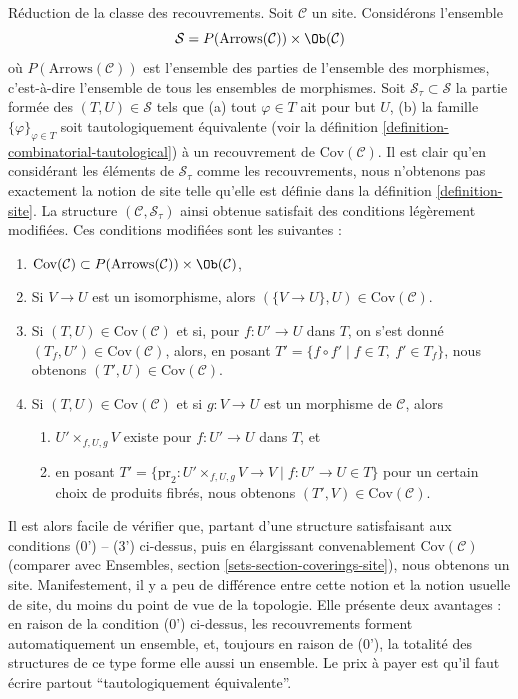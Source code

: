 \begin{remark}
\label{remark-shrink-coverings}
Réduction de la classe des recouvrements. Soit $\mathcal{C}$ un site.
Considérons l'ensemble
$$
\mathcal{S} = P(\text{Arrows}(\mathcal{C})) \times \Ob(\mathcal{C})
$$
où $P(\text{Arrows}(\mathcal{C}))$ est l'ensemble des parties de l'ensemble des morphismes,
c'est-à-dire l'ensemble de tous les ensembles de morphismes.
Soit $\mathcal{S}_\tau \subset \mathcal{S}$
la partie formée des $(T, U) \in \mathcal{S}$ tels que
(a) tout $\varphi \in T$ ait pour but $U$,
(b) la famille $\{\varphi\}_{\varphi \in T}$ soit tautologiquement
équivalente (voir la définition \ref{definition-combinatorial-tautological})
à un recouvrement de $\text{Cov}(\mathcal{C})$.
Il est clair qu'en considérant les éléments de $\mathcal{S}_\tau$ comme
les recouvrements, nous n'obtenons pas exactement la notion de site
telle qu'elle est définie dans la définition \ref{definition-site}.
La structure $(\mathcal{C}, \mathcal{S}_\tau)$
ainsi obtenue satisfait des conditions légèrement modifiées. Ces
conditions modifiées sont les suivantes :
\begin{enumerate}
\item[(0')] $\text{Cov}(\mathcal{C}) \subset
P(\text{Arrows}(\mathcal{C})) \times \Ob(\mathcal{C})$,
\item[(1')] Si $V \to U$ est un isomorphisme, alors
$(\{V \to U\}, U) \in \text{Cov}(\mathcal{C})$.
\item[(2')] Si $(T, U) \in \text{Cov}(\mathcal{C})$
et si, pour $f : U' \to U$ dans $T$, on s'est donné
$(T_f, U') \in \text{Cov}(\mathcal{C})$,
alors, en posant $T' = \{f \circ f' \mid f \in T,\ f' \in T_f\}$,
nous obtenons $(T', U) \in \text{Cov}(\mathcal{C})$.
\item[(3')] Si $(T, U) \in \text{Cov}(\mathcal{C})$ et si $g : V \to U$
est un morphisme de $\mathcal{C}$, alors
\begin{enumerate}
\item $U' \times_{f, U, g} V$ existe pour $f : U' \to U$ dans $T$, et
\item en posant
$T' = \{\text{pr}_2 : U' \times_{f, U, g} V \to V \mid f : U' \to U \in T\}$
pour un certain choix de produits fibrés, nous obtenons $(T', V) \in \text{Cov}(\mathcal{C})$.
\end{enumerate}
\end{enumerate}
Il est alors facile de vérifier que, partant d'une structure satisfaisant
aux conditions (0') -- (3') ci-dessus, puis en élargissant convenablement
$\text{Cov}(\mathcal{C})$ (comparer avec Ensembles,
section \ref{sets-section-coverings-site}), nous obtenons un site.
Manifestement, il y a peu de différence entre cette notion et la
notion usuelle de site, du moins du point de vue de la
topologie. Elle présente deux avantages :
en raison de la condition (0') ci-dessus, les recouvrements forment automatiquement
un ensemble, et, toujours en raison de (0'), la totalité des structures
de ce type forme elle aussi un ensemble.
Le prix à payer est qu'il faut écrire partout
``tautologiquement équivalente''.
\end{remark}
